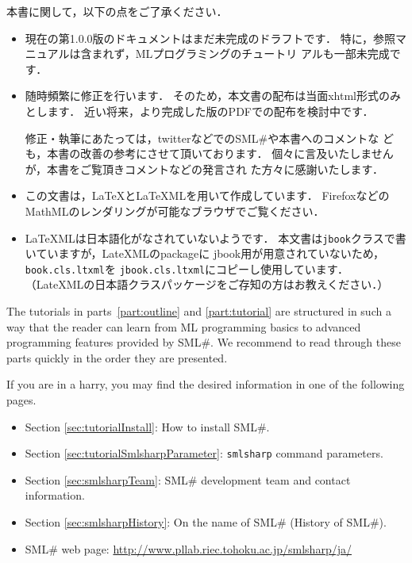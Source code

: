 \documentclass{jbook}
\newcommand{\smlsharp}{SML\#}
\newcommand{\version}{1.0.0}
\begin{document}
本書に関して，以下の点をご了承ください．
\begin{itemize}
\item 
	現在の第\version{}版のドキュメントはまだ未完成のドラフトです．
	特に，参照マニュアルは含まれず，MLプログラミングのチュートリ
アルも一部未完成です．

\item 随時頻繁に修正を行います．
	そのため，本文書の配布は当面xhtml形式のみとします．
	近い将来，より完成した版のPDFでの配布を検討中です．

	修正・執筆にあたっては，twitterなどでの\smlsharp{}や本書へのコメントな
ども，本書の改善の参考にさせて頂いております．
	個々に言及いたしませんが，本書をご覧頂きコメントなどの発言され
た方々に感謝いたします． 

\item この文書は，LaTeXとLaTeXMLを用いて作成しています．
FirefoxなどのMathMLのレンダリングが可能なブラウザでご覧ください．

\item LaTeXMLは日本語化がなされていないようです．
	本文書は{\tt jbook}クラスで書いていますが，LateXMLのpackageに
jbook用が用意されていないため，{\tt book.cls.ltxml}を
{\tt jbook.cls.ltxml}にコピーし使用しています．
	（LateXMLの日本語クラスパッケージをご存知の方はお教えください．）
\end{itemize}
\else%

	The tutorials in parts~\ref{part:outline} and
\ref{part:tutorial} are structured in such a way that the reader can
learn from ML programming basics to advanced programming features
provided by \smlsharp{}.
	We recommend to read through these parts quickly in the order
they are presented.

	If you are in a harry, you may find the desired information in
one of the following pages.
\begin{itemize}
\item Section \ref{sec:tutorialInstall}: How to install \smlsharp{}.
\item Section \ref{sec:tutorialSmlsharpParameter}: {\tt smlsharp} command parameters.
\item Section \ref{sec:smlsharpTeam}: \smlsharp{} development team and
contact information.
\item Section \ref{sec:smlsharpHistory}: On the name of \smlsharp{}
(History of \smlsharp).
\item \smlsharp{} web page:
\url{http://www.pllab.riec.tohoku.ac.jp/smlsharp/ja/}
\end{itemize}
\end{document}
